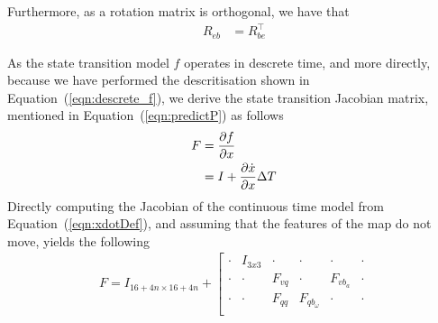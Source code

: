 \documentclass[]{article}
\begin{document}
{Furthermore, as a rotation matrix is orthogonal, we have that
\begin{align}
	R_{eb} &= R_{be}^\top
\end{align}

As the state transition model $f$ operates in descrete time, and more directly, because we have performed the descritisation shown in Equation~(\ref{eqn:descrete_f}), we derive the state transition Jacobian matrix, mentioned in Equation~(\ref{eqn:predictP}) as follows
\begin{align}
	F &= \frac{\partial f}{\partial x} \notag \\
	&=
	\label{eqn:descrete_F}
	I + \frac{\partial \dot{x}}{\partial x} \Delta T
\end{align}
Directly computing the Jacobian of the continuous time model from Equation~(\ref{eqn:xdotDef}), and assuming that the features of the map do not move, yields the following
\begin{align}
	F = I_{16+4n \times 16+4n} +
	\left[
	\begin{matrix}
		\cdot 		& I_{3x3} 	& \cdot	 	& \cdot		 	& \cdot		& \cdot \\
		\cdot		& \cdot	 	& F_{vq}	& \cdot		 	& F_{vb_a} 	& \cdot \\
		\cdot		& \cdot	 	& F_{qq}	& F_{qb_\omega}	& \cdot		& \cdot \\

\end{matrix}
\end{align}}
\end{document}
